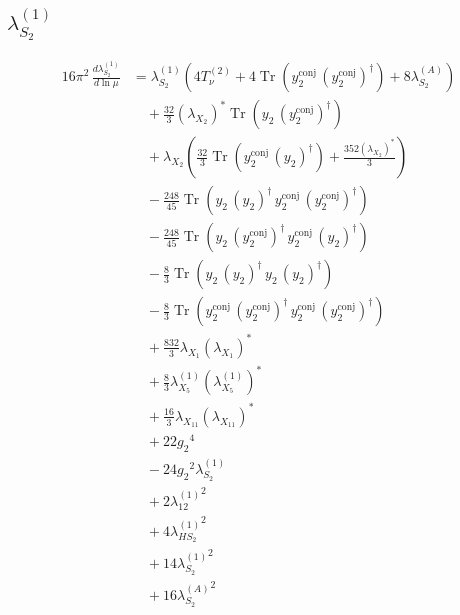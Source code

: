 \documentclass[10pt,a4paper]{article}
\begin{document}
\subsection*{$\lambda_{S_2}^{(1)}$}
\begin{align*}
16\pi^2\,\frac{d \lambda_{S_2}^{(1)}}{d\ln\mu} &={\lambda_{S_2}^{(1)}} (4 T_{\nu}^{(2)}+4 \operatorname{Tr}\!\left({y_{2}^{\mathrm{conj}}}\,\left({y_{2}^{\mathrm{conj}}}\right)^{\dagger}\right)+8 {\lambda_{S_2}^{(A)}}) \\
&\quad +\frac{32}{3} \left({\lambda_{X_{2}}}\right)^{*} \operatorname{Tr}\!\left({y_2}\,\left({y_{2}^{\mathrm{conj}}}\right)^{\dagger}\right) \\
&\quad +{\lambda_{X_{2}}} \left(\frac{32}{3} \operatorname{Tr}\!\left({y_{2}^{\mathrm{conj}}}\,\left({y_2}\right)^{\dagger}\right)+\frac{352 \left({\lambda_{X_{2}}}\right)^{*}}{3}\right) \\
&\quad -\frac{248}{45} \operatorname{Tr}\!\left({y_2}\,\left({y_2}\right)^{\dagger}\,{y_{2}^{\mathrm{conj}}}\,\left({y_{2}^{\mathrm{conj}}}\right)^{\dagger}\right) \\
&\quad -\frac{248}{45} \operatorname{Tr}\!\left({y_2}\,\left({y_{2}^{\mathrm{conj}}}\right)^{\dagger}\,{y_{2}^{\mathrm{conj}}}\,\left({y_2}\right)^{\dagger}\right) \\
&\quad -\frac{8}{3} \operatorname{Tr}\!\left({y_2}\,\left({y_2}\right)^{\dagger}\,{y_2}\,\left({y_2}\right)^{\dagger}\right) \\
&\quad -\frac{8}{3} \operatorname{Tr}\!\left({y_{2}^{\mathrm{conj}}}\,\left({y_{2}^{\mathrm{conj}}}\right)^{\dagger}\,{y_{2}^{\mathrm{conj}}}\,\left({y_{2}^{\mathrm{conj}}}\right)^{\dagger}\right) \\
&\quad +\frac{832}{3} {\lambda_{X_{1}}} \left({\lambda_{X_{1}}}\right)^{*} \\
&\quad +\frac{8}{3} {\lambda_{X_{5}}^{(1)}} \left({\lambda_{X_{5}}^{(1)}}\right)^{*} \\
&\quad +\frac{16}{3} {\lambda_{X_{11}}} \left({\lambda_{X_{11}}}\right)^{*} \\
&\quad +22 {g_2}^4 \\
&\quad -24 {g_2}^2 {\lambda_{S_2}^{(1)}} \\
&\quad +2 {\lambda_{12}^{(1)}}^2 \\
&\quad +4 {\lambda_{HS_2}^{(1)}}^2 \\
&\quad +14 {\lambda_{S_2}^{(1)}}^2 \\
&\quad +16 {\lambda_{S_2}^{(A)}}^2 \\
\end{align*}
\end{document}
